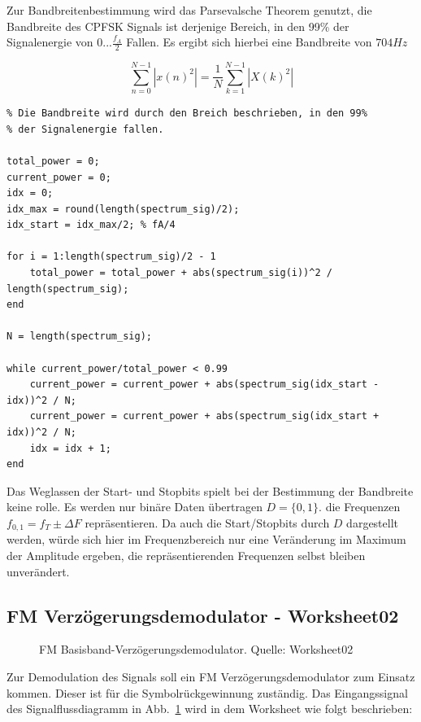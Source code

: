 \documentclass{article}
\begin{document}
Zur Bandbreitenbestimmung wird das Parsevalsche Theorem genutzt, die Bandbreite des \ac{CPFSK} Signals ist derjenige Bereich,
in den 99\% der Signalenergie von $0...\frac{f_A}{2}$ Fallen. Es ergibt sich hierbei eine Bandbreite von $704Hz$

$$
\sum_{n = 0}^{N - 1}\left\lvert x(n)^2\right\rvert =  \frac{1}{N} \sum_{k = 1}^{N-1}  \left\lvert X(k)^2\right\rvert 
$$
\begin{listing}
\begin{verbatim}
% Die Bandbreite wird durch den Breich beschrieben, in den 99%
% der Signalenergie fallen.

total_power = 0;
current_power = 0;
idx = 0;
idx_max = round(length(spectrum_sig)/2);
idx_start = idx_max/2; % fA/4

for i = 1:length(spectrum_sig)/2 - 1
    total_power = total_power + abs(spectrum_sig(i))^2 / length(spectrum_sig);
end

N = length(spectrum_sig);

while current_power/total_power < 0.99
    current_power = current_power + abs(spectrum_sig(idx_start - idx))^2 / N;
    current_power = current_power + abs(spectrum_sig(idx_start + idx))^2 / N;
    idx = idx + 1;
end
\end{verbatim}
\end{listing}

Das Weglassen der Start- und Stopbits spielt bei der Bestimmung der Bandbreite keine rolle.
Es werden nur binäre Daten übertragen $D = \{0, 1\}$. die Frequenzen $ f_{0, 1} = f_T \pm \varDelta F $ repräsentieren. 
Da auch die Start/Stopbits durch $D$ dargestellt werden, würde sich hier im Frequenzbereich
nur eine Veränderung im Maximum der Amplitude ergeben, die repräsentierenden Frequenzen selbst bleiben unverändert.

\subsection{FM Verzögerungsdemodulator - Worksheet02}

\begin{figure}[!h]
    \centering
    \def\svgscale{0.5}
    \def\svgwidth{\columnwidth}
    
    \caption{FM Basisband-Verzögerungsdemodulator. Quelle: Worksheet02}
    \label{fig:fm-verz}
\end{figure}

Zur Demodulation des Signals soll ein FM Verzögerungsdemodulator zum Einsatz kommen. Dieser ist für die Symbolrückgewinnung zuständig. 
Das Eingangssignal des Signalflussdiagramm in Abb.~\ref{fig:fm-verz} wird in dem Worksheet wie folgt beschrieben:
\end{document}
